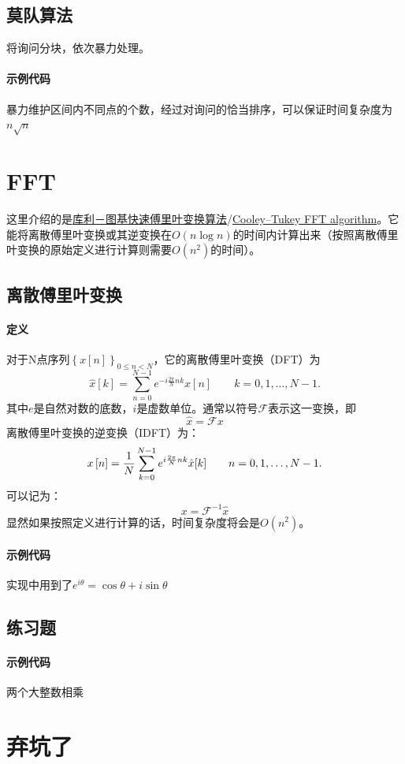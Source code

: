 \documentclass[]{cpp}
\begin{document}
\subsection{莫队算法} 将询问分块，依次暴力处理。
\paragraph{示例代码} 暴力维护区间内不同点的个数，经过对询问的恰当排序，可以保证时间复杂度为$n\sqrt{n}$
\section{FFT} 这里介绍的是\href{https://zh.wikipedia.org/wiki/库利－图基快速傅里叶变换算法}{库利－图基快速傅里叶变换算法}/\href{https://en.wikipedia.org/wiki/Cooley–Tukey_FFT_algorithm}{Cooley–Tukey FFT algorithm}。它能将离散傅里叶变换或其逆变换在$O(n\log{n})$的时间内计算出来（按照离散傅里叶变换的原始定义进行计算则需要$O(n^2)$的时间）。
\subsection{离散傅里叶变换}
\paragraph{定义}
	对于N点序列$\left\{x[n]\right\}_{0\le n <N}$，它的离散傅里叶变换（DFT）为$$\hat{x}[k]=\sum_{n=0}^{N-1} e^{-i\frac{2\pi}{N}nk}x[n] \qquad k = 0,1,\ldots,N-1.$$其中$e$是自然对数的底数，$i$是虚数单位。通常以符号$\mathcal{F}$表示这一变换，即$$\hat{x}=\mathcal{F}x$$
	离散傅里叶变换的逆变换（IDFT）为：$$x\left[n\right]={1 \over N}\sum_{k=0}^{N-1} e^{ i\frac{2\pi}{N}nk}\hat{x}[k] \qquad n = 0,1,\ldots,N-1.$$可以记为：$$x=\mathcal{F}^{-1}\hat{x}$$
	显然如果按照定义进行计算的话，时间复杂度将会是$O(n^2)$。
\paragraph{示例代码} 实现中用到了$e^{i\theta}=\cos\theta+i\sin\theta$
\subsection{练习题}
\paragraph{示例代码} 两个大整数相乘
\section{弃坑了}
\end{document}
